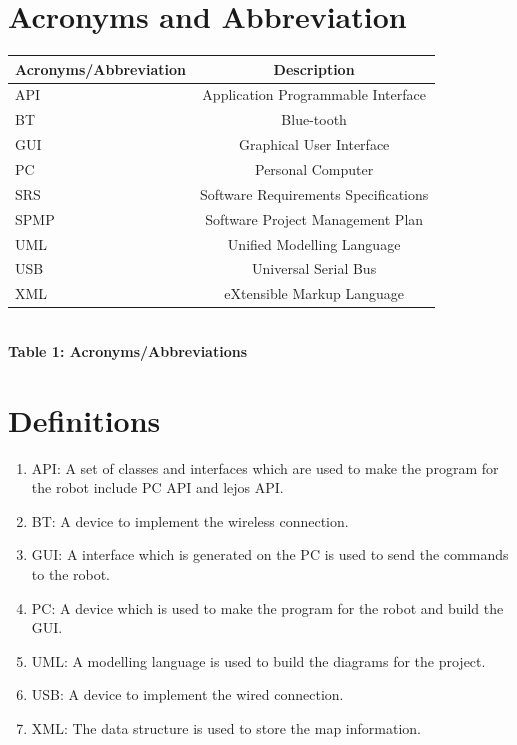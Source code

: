 \documentclass[11pt, a4paper]{report}
\begin{document}
\section{Acronyms and Abbreviation}
\begin{center}
\begin{tabular}{|l|c|}
  \hline
  \textbf{Acronyms/Abbreviation} & \textbf{Description}\\
  \hline
  API		& Application Programmable Interface \\
  \hline
  BT		& Blue-tooth \\
  \hline
  GUI		& Graphical User Interface \\
  \hline
  PC		& Personal Computer\\
  \hline
  SRS	& Software Requirements Specifications \\
  \hline
  SPMP 	& Software Project Management Plan \\
  \hline
  UML	& Unified Modelling Language\\
  \hline
  USB	& Universal Serial Bus\\
  \hline
  XML 	& eXtensible Markup Language \\
  \hline
\end{tabular} \\[0.3cm]

\textbf {Table 1: Acronyms/Abbreviations} \\[0.3cm]
\end{center}
\section{Definitions}
\begin{enumerate}
\item API: A set of classes and interfaces which are used to make the program for the robot include PC API and lejos API.\\
\item BT: A device to implement the wireless connection.\\
\item GUI: A interface which is generated on the PC is used to send the commands to the robot.\\
\item PC: A device which is used to make the program for the robot and build the GUI.\\
\item UML: A modelling language is used to build the diagrams for the project.\\
\item USB: A device to implement the wired connection.\\
\item XML: The data structure is used to store the map information.\\
\end{enumerate}
\pagebreak
\newpage
\appendix

\pagebreak
\end{document}
